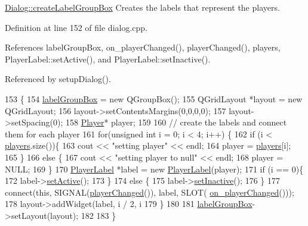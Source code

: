 \hyperlink{class_dialog_a3e7333b738c6b84b861dac7ea957244a}{Dialog\-::create\-Label\-Group\-Box} Creates the labels that represent the players. 



Definition at line 152 of file dialog.\-cpp.



References label\-Group\-Box, on\-\_\-player\-Changed(), player\-Changed(), players, Player\-Label\-::set\-Active(), and Player\-Label\-::set\-Inactive().



Referenced by setup\-Dialog().


\begin{DoxyCode}
153 \{
154     \hyperlink{class_dialog_a93ffff453dba285f896156d073d58220}{labelGroupBox} = \textcolor{keyword}{new} QGroupBox();
155     QGridLayout *layout = \textcolor{keyword}{new} QGridLayout;
156     layout->setContentsMargins(0,0,0,0);
157     layout->setSpacing(0);
158     \hyperlink{class_player}{Player}* player;
159 
160     \textcolor{comment}{// create the labels and connect them for each player}
161     \textcolor{keywordflow}{for}(\textcolor{keywordtype}{unsigned} \textcolor{keywordtype}{int} i = 0; i < 4; i++) \{
162         \textcolor{keywordflow}{if} (i < \hyperlink{class_dialog_a93e79b9554adff375010cc56a29c82b0}{players}.size())\{
163              cout << \textcolor{stringliteral}{"setting player"} << endl;
164             player = \hyperlink{class_dialog_a93e79b9554adff375010cc56a29c82b0}{players}[i];
165         \}
166         \textcolor{keywordflow}{else} \{
167             cout << \textcolor{stringliteral}{"setting player to null"} << endl;
168             player = NULL;
169         \}
170         \hyperlink{class_player_label}{PlayerLabel} *label = \textcolor{keyword}{new} \hyperlink{class_player_label}{PlayerLabel}(player);
171         \textcolor{keywordflow}{if} (i == 0)\{
172             label->\hyperlink{class_player_label_a2dfa25456fac3bd2f0a7bbaa4fac6678}{setActive}();
173         \}
174         \textcolor{keywordflow}{else} \{
175             label->\hyperlink{class_player_label_aecd91b6a5f19cd8228869a23bdb7da02}{setInactive}();
176         \}
177         connect(\textcolor{keyword}{this}, SIGNAL(\hyperlink{class_dialog_a5f21e292b0ba87e64682cc7b7a53c7cc}{playerChanged}()), label, SLOT(
      \hyperlink{class_dialog_a87138e5c0a7a9fefab5549695686117a}{on\_playerChanged}()));
178         layout->addWidget(label, i / 2, i %
179     \}
180 
181     \hyperlink{class_dialog_a93ffff453dba285f896156d073d58220}{labelGroupBox}->setLayout(layout);
182 
183 \}
\end{DoxyCode}
